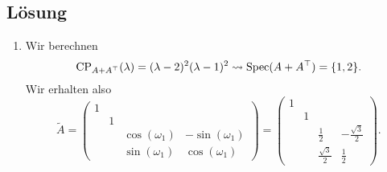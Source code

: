 \subsection{Lösung}
\begin{enumerate}
	\item Wir berechnen
	\begin{equation*}
		\text{CP}_{A+A^\top}(\lambda) = (\lambda - 2)^2(\lambda-1)^2 \leadsto \text{Spec}(A+A^\top) = \{ 1,2 \}\text{.}
	\end{equation*}
	Wir erhalten also
	\begin{equation*}
		\widetilde{A} = \begin{pmatrix}
			1 & & & \\
			& 1 & & \\
			 & & \cos(\omega_1) & -\sin(\omega_1) \\
			 & & \sin(\omega_1) & \cos(\omega_1)
		\end{pmatrix} = \begin{pmatrix}
			1 & & & \\
			& 1 & & \\
			& & \tfrac{1}{2} & -\tfrac{\sqrt{3}}{2} \\
			& & \tfrac{\sqrt{3}}{2} & \tfrac{1}{2}
		\end{pmatrix}\text{.}
	\end{equation*}


\end{enumerate}
